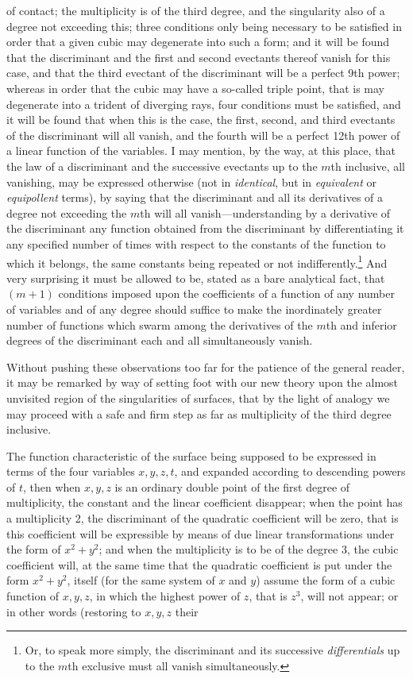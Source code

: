 \documentclass[11pt]{article}
\newcommand{\sourcepage}[1]{\marginpar{\scriptsize p.~#1}}
\begin{document}
{{\sourcepage{374}
of contact; the multiplicity is of the third degree, and the singularity also of a degree not exceeding this; three conditions only being necessary to be satisfied in order that a given cubic may degenerate into such a form; and it will be found that the discriminant and the first and second evectants thereof vanish for this case, and that the third evectant of the discriminant will be a perfect 9th power; whereas in order that the cubic may have a so-called triple point, that is may degenerate into a trident of diverging rays, four conditions must be satisfied, and it will be found that when this is the case, the first, second, and third evectants of the discriminant will all vanish, and the fourth will be a perfect 12th power of a linear function of the variables. I may mention, by the way, at this place, that the law of a discriminant and the successive evectants up to the $m$th inclusive, all vanishing, may be expressed otherwise (not in \emph{identical}, but in \emph{equivalent} or \emph{equipollent} terms), by saying that the discriminant and all its derivatives of a degree not exceeding the $m$th will all vanish---understanding by a derivative of the discriminant any function obtained from the discriminant by differentiating it any specified number of times with respect to the constants of the function to which it belongs, the same constants being repeated or not indifferently.\footnote{Or, to speak more simply, the discriminant and its successive \emph{differentials} up to the $m$th exclusive must all vanish simultaneously.} And very surprising it must be allowed to be, stated as a bare analytical fact, that $(m+1)$ conditions imposed upon the coefficients of a function of any number of variables and of any degree should suffice to make the inordinately greater number of functions which swarm among the derivatives of the $m$th and inferior degrees of the discriminant each and all simultaneously vanish.

Without pushing these observations too far for the patience of the general reader, it may be remarked by way of setting foot with our new theory upon the almost unvisited region of the singularities of surfaces, that by the light of analogy we may proceed with a safe and firm step as far as multiplicity of the third degree inclusive.

The function characteristic of the surface being supposed to be expressed in terms of the four variables $x,y,z,t$, and expanded according to descending powers of $t$, then when $x,y,z$ is an ordinary double point of the first degree of multiplicity, the constant and the linear coefficient disappear; when the point has a multiplicity 2, the discriminant of the quadratic coefficient will be zero, that is this coefficient will be expressible by means of due linear transformations under the form of $x^2+y^2$; and when the multiplicity is to be of the degree 3, the cubic coefficient will, at the same time that the quadratic coefficient is put under the form $x^2+y^2$, itself (for the same system of $x$ and $y$) assume the form of a cubic function of $x,y,z$, in which the highest power of $z$, that is $z^3$, will not appear; or in other words (restoring to $x,y,z$ their

}}
\end{document}
